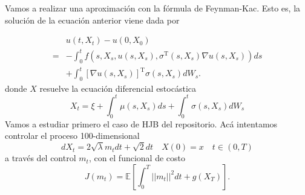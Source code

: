 \documentclass{article}
\begin{document}
Vamos a realizar una aproximación con la fórmula de Feynman-Kac. Esto es, la solución de la ecuación anterior viene dada por 

\begin{equation}
	\begin{aligned}
		& u\left(t, X_t\right)-u\left(0, X_0\right) \\
		=&-\int_0^t f\left(s, X_s, u\left(s, X_s\right), \sigma^{\mathrm{T}}\left(s, X_s\right) \nabla u\left(s, X_s\right)\right) d s \\
		&+\int_0^t\left[\nabla u\left(s, X_s\right)\right]^{\mathrm{T}} \sigma\left(s, X_s\right) d W_s .
	\end{aligned}
\end{equation}
donde $X$ resuelve la ecuación diferencial estocástica
\begin{equation}
	X_t=\xi+\int_0^t \mu\left(s, X_s\right) d s+\int_0^t \sigma\left(s, X_s\right) d W_s
\end{equation}
Vamos a estudiar primero el caso de HJB del repositorio. Acá intentamos controlar el proceso 100-dimensional
\begin{equation}
	dX_t=2\sqrt{\lambda}m_t dt +\sqrt{2}dt \quad X(0)=x \quad t\in (0,T)
\end{equation}
a través del control $m_t$, con el funcional de costo
\begin{equation}
	J(m_t)=\mathbb{E}\left[\int_{0}^{T}||m_t||^2 dt +g(X_T)\right].
\end{equation}
\end{document}
